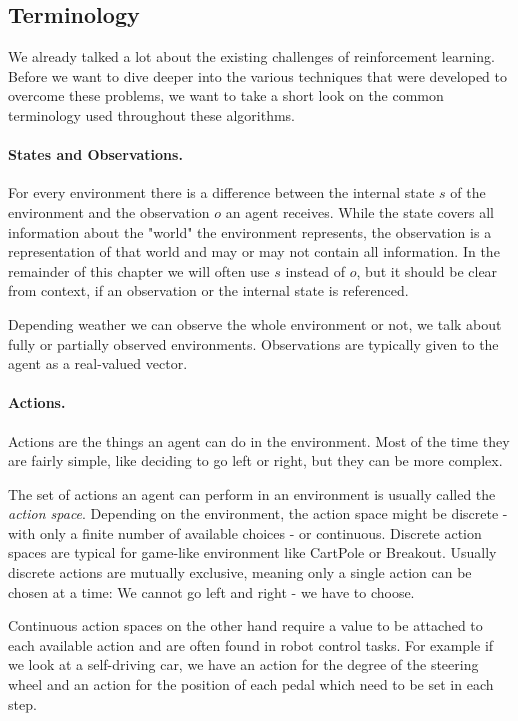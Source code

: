 \subsection{Terminology} \label{ssec:rlterms}
We already talked a lot about the existing challenges of reinforcement learning. Before we want to dive deeper into the various techniques that were developed to overcome these problems, we want to take a short look on the common terminology used throughout these algorithms.

\paragraph{States and Observations.}
For every environment there is a difference between the internal state $s$ of the environment and the observation $o$ an agent receives. While the state covers all information about the "world" the environment represents, the observation is a representation of that world and may or may not contain all information.  In the remainder of this chapter we will often use $s$ instead of $o$, but it should be clear from context, if an observation or the internal state is referenced. 

Depending weather we can observe the whole environment or not, we talk about fully or partially observed environments. Observations are typically given to the agent as a real-valued vector.

\paragraph{Actions.}
Actions are the things an agent can do in the environment. Most of the time they are fairly simple, like deciding to go left or right, but they can be more complex.

The set of actions an agent can perform in an environment is usually called the \textit{action space}. Depending on the environment, the action space might be discrete - with only a finite number of available choices - or continuous. Discrete action spaces are typical for game-like environment like CartPole or Breakout. Usually discrete actions are mutually exclusive, meaning only a single action can be chosen at a time: We cannot go left and right - we have to choose.

Continuous action spaces on the other hand require a value to be attached to each available action and are often found in robot control tasks. For example if we look at a self-driving car, we have an action for the degree of the steering wheel and an action for the position of each pedal which need to be set in each step.

